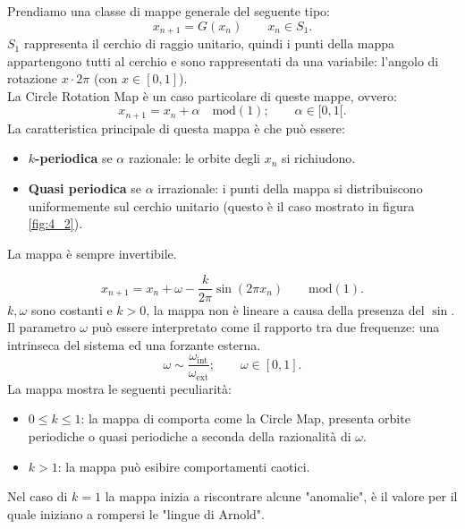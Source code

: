     \begin{exmp}
	Prendiamo una classe di mappe generale del seguente tipo:
        \[
	    x_{n+1} = G(x_n) \qquad x_n \in S_1
        .\] 
	$S_1$ rappresenta il cerchio di raggio unitario, quindi i punti della mappa appartengono tutti al cerchio e sono rappresentati da una variabile: l'angolo di rotazione $x\cdot 2\pi$ (con $x \in \left[0,1\right]$).
	\\
	La Circle Rotation Map è un caso particolare di queste mappe, ovvero:
	\[
	    x_{n+1}=x_n+\alpha  \quad \text{mod}(1); \qquad \alpha\in [0,1[
	.\] 
	La caratteristica principale di questa mappa è che può essere:
	\begin{itemize}
	    \item \textbf{$k$-periodica} se $\alpha$ razionale: le orbite degli $x_n$ si richiudono.
	    \item \textbf{Quasi periodica} se $\alpha$ irrazionale: i punti della mappa si distribuiscono uniformemente sul cerchio unitario (questo è il caso mostrato in figura \ref{fig:4_2}).
	\end{itemize}
	La mappa è sempre invertibile. 
\end{exmp}
\noindent
\begin{exmp}
        \[
	    x_{n+1} = x_n + \omega  - \frac{k}{2\pi}\sin (2\pi x_n) \qquad \text{mod}(1) 
        .\] 
	$k, \omega$ sono costanti e $k>0$, la mappa non è lineare a causa della presenza del $\sin$.\\
	Il parametro $\omega$ può essere interpretato come il rapporto tra due frequenze: una intrinseca del sistema ed una forzante esterna.
	\[
	    \omega  \sim \frac{\omega_{\text{int}}}{\omega_{\text{ext}}}; \qquad \omega \in \left[0,1\right]
	.\]
	La mappa mostra le seguenti peculiarità:
	\begin{itemize}
	    \item $0\le k\le 1$: la mappa di comporta come la Circle Map, presenta orbite periodiche o quasi periodiche a seconda della razionalità di $\omega$. 
	    \item $k>1$: la mappa può esibire comportamenti caotici.
	\end{itemize}
	Nel caso di $k=1$ la mappa inizia a riscontrare alcune "anomalie", è il valore per il quale iniziano a rompersi le "lingue di Arnold".
\end{exmp}
\noindent

